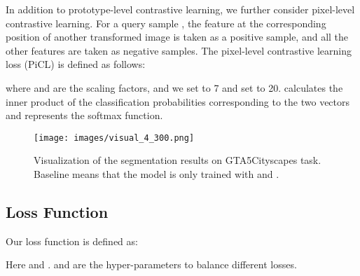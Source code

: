 \documentclass[sigconf]{acmart}
\begin{document}
		
		
		In addition to prototype-level contrastive learning, we further consider pixel-level contrastive learning. For a query sample , the feature  at the corresponding position of another transformed image is taken as a positive sample, and all the other features are taken as negative samples. The pixel-level contrastive learning loss (PiCL) is defined as follows:
		
		where  and   are the scaling factors, and we set  to 7 and set  to 20.   calculates the inner product of the classification probabilities corresponding to the two vectors and  represents the softmax function.
		
		
		\begin{figure*}
			\centering
			\texttt{[image: images/visual\_4\_300.png]}
			\caption{Visualization of the segmentation results on GTA5Cityscapes task. Baseline means that the model is only trained with  and .}
			\label{figure:vis}
			\vspace{-10pt}
		\end{figure*}
\subsection{Loss Function}
		Our loss function is defined as:
		
		Here  and .  and  are the hyper-parameters to balance different losses.
		
		
		
\end{document}
